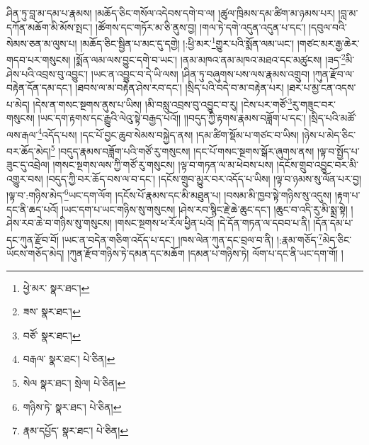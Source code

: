 ཤིན་ཏུ་བླ་མ་དམ་པ་རྣམས། །མཆོད་ཅིང་གསོལ་འདེབས་དགེ་བ་ལ། །ཚུལ་ཁྲིམས་དམ་ཚིག་མ་ཉམས་པར། །བླ་མ་དཀོན་མཆོག་མི་མོས་སྤང་། །ཚོགས་དང་གཏོར་མ་ཅི་ནུས་བྱ། །གལ་ཏེ་དགེ་འདུན་འདུན་པ་དང་། །དབུལ་བའི་སེམས་ཅན་མ་ལུས་པ། །མཆོད་ཅིང་སྦྱིན་པ་མང་དུ་དགྱེ། །:ཕྱི་མར་\footnote{ཕྱེ་མར་  སྣར་ཐང་། }གྱུར་པའི་སྨོན་ལམ་ཡང་། །གཙང་མར་རྒྱ་ཆེར་གདབ་པར་གསུངས། །སྨོན་ལམ་ལས་བྱུང་དགེ་བ་ཡང་། །ནམ་མཁའ་ནམ་མཁའ་མཐའ་དང་མཚུངས། །ཟད་\footnote{ཟས་  སྣར་ཐང་། }མི་ཤེས་པའི་འབྲས་བུ་འབྱུང་། །ཡང་ན་འབྱུང་བ་དེ་ཡི་ལས། །ཤིན་ཏུ་བཞུགས་པས་ལས་རྣམས་འགྲུབ། །ཀུན་རྫོབ་ལ་བརྟེན་དོན་དམ་དང་། །ཐབས་ལ་མ་བརྟེན་ཤེས་རབ་དང་། །སྲིད་པའི་བདེ་བ་མ་བརྟེན་པར། །ཐར་པ་མྱ་ངན་འདས་པ་མེད། །དེས་ན་གསང་སྔགས་ནུས་པ་ཡིས། །མི་བསླུ་འབྲས་བུ་འབྱུང་བ་རུ། །ངེས་པར་གཙོ་\footnote{བཙོ་  སྣར་ཐང་། }རུ་གཟུང་བར་གསུངས། །ཡང་དག་རྟགས་དང་རྒྱུའི་ལེའུ་སྟེ་བརྒྱད་པའོ།། །།བདུད་ཀྱི་རྟགས་རྣམས་བཟློག་པ་དང་། །སྲིད་པའི་མཚོ་ལས་རྒལ་\footnote{བརྒལ་  སྣར་ཐང་།  པེ་ཅིན། }འདོད་པས། །དང་པོ་བྱང་ཆུབ་སེམས་བསྐྱེད་ནས། །དམ་ཚིག་སྡོམ་པ་གཙང་བ་ཡིས། །ཉེས་པ་མེད་ཅིང་བར་ཆོད་མེད།\footnote{སེལ  སྣར་ཐང་། སྲེལ།  པེ་ཅིན། } །བདུད་རྣམས་བཟློག་པའི་གཙོ་རུ་གསུངས། །དང་པོ་གསང་སྔགས་སྒོར་ཞུགས་ནས། །ལྟ་བ་སྤྱོད་པ་ཟུང་དུ་འབྲེལ། །གསང་སྔགས་ལས་ཀྱི་གཙོ་རུ་གསུངས། །ལྟ་བ་གཏན་ལ་མ་ཕེབས་པས། །དངོས་གྲུབ་འབྱུང་བར་མི་འགྱུར་བས། །བདུད་ཀྱི་བར་ཆོད་བས་ལ་བ་དང་། །དངོས་གྲུབ་མྱུར་བར་འདོད་པ་ཡིས། །ལྟ་བ་ཉམས་སུ་ལོན་པར་བྱ། །ལྟ་བ་:གཉིས་མེད་\footnote{གཉིས་ཏེ་  སྣར་ཐང་།  པེ་ཅིན། }ཡང་དག་ལོག །དངོས་པོ་རྣམས་དང་མི་མཐུན་པ། །བསམ་མི་ཁྱབ་སྟེ་གཉིས་སུ་འདུས། །རྟག་པ་དང་ནི་ཆད་པའོ། །ཡང་དག་པ་ཡང་གཉིས་སུ་གསུངས། །ཤེས་རབ་སྙིང་རྗེ་ཆེ་ཆུང་དང་། །ཆུང་བ་འདི་རུ་མི་སྨྲ་སྟེ། །ཤེས་རབ་ཆེ་བ་གཉིས་སུ་གསུངས། །གསང་སྔགས་ཕ་རོལ་ཕྱིན་པའོ། །དེ་དོན་གཏན་ལ་དབབ་པ་ནི། །དོན་དམ་པ་དང་ཀུན་རྫོབ་བོ། །ཡང་ན་བདེན་གཅིག་འདོད་པ་དང་། །ཁས་ལེན་ཀུན་དང་བྲལ་བ་ནི། །:རྣམ་གཅོད་\footnote{རྣམ་དཔྱོད་  སྣར་ཐང་།  པེ་ཅིན། }མེད་ཅིང་ཡོངས་གཅོད་མེད། །ཀུན་རྫོབ་གཉིས་ཏེ་དམན་དང་མཆོག །དམན་པ་གཉིས་ཏེ། ལོག་པ་དང་ནི་ཡང་དག་གོ། །

